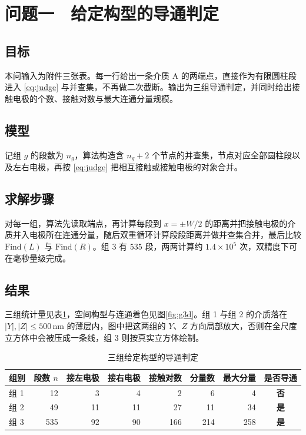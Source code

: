 \documentclass[UTF8,a4paper,zihao=-4,fontset=none]{ctexart}
\begin{document}
\section{问题一　给定构型的导通判定}

\subsection{目标}

本问输入为附件三张表。每一行给出一条介质 A 的两端点，直接作为有限圆柱段进入 \eqref{eq:judge} 与并查集，不再做二次截断。输出为三组导通判定，并同时给出接触电极的个数、接触对数与最大连通分量规模。

\subsection{模型}

记组 $g$ 的段数为 $n_g$，算法构造含 $n_g+2$ 个节点的并查集，节点对应全部圆柱段以及左右电极，再按 \eqref{eq:judge} 把相互接触或接触电极的对象合并。

\subsection{求解步骤}

对每一组，算法先读取端点，再计算每段到 $x=\pm W/2$ 的距离并把接触电极的介质并入电极所在连通分量，随后双重循环计算段段距离并做并查集合并，最后比较 $\mathrm{Find}(L)$ 与 $\mathrm{Find}(R)$。组 3 有 $535$ 段，两两计算约 $1.4\times 10^5$ 次，双精度下可在毫秒量级完成。

\subsection{结果}

三组统计量见表\ref{tab:p1}，空间构型与连通着色见图\ref{fig:g3d}。组 1 与组 2 的介质落在 $|Y|,|Z|\le 500\,\mathrm{nm}$ 的薄层内，图中把这两组的 $Y$、$Z$ 方向局部放大，否则在全尺度立方体中会被压成一条线，组 3 则按真实立方体绘制。

\begin{table}[H]
\centering
\caption{三组给定构型的导通判定}
\label{tab:p1}
{\small
\begin{tabular}{lrrrrrrc}
\toprule
组别 & 段数 $n$ & 接左电极 & 接右电极 & 接触对数 & 分量数 & 最大分量 & 是否导通 \\
\midrule
组 1 & 12 & 3 & 4 & 2 & 6 & 4 & \textbf{否} \\
组 2 & 49 & 11 & 11 & 27 & 11 & 34 & \textbf{是} \\
组 3 & 535 & 92 & 90 & 166 & 214 & 258 & \textbf{是} \\
\bottomrule
\end{tabular}
}
\end{table}
\end{document}
